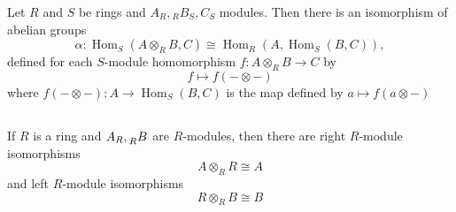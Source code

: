 \begin{theorem}
    Let $R$ and $S$ be rings and $A_{R},{ }_R B_{S}, C_{S}$ modules. Then there is an isomorphism of abelian groups
    \begin{equation*}
        \alpha: \operatorname{Hom}_{S}\left(A \otimes_R B, C\right)
        \cong
        \operatorname{Hom}_{R}\left(A, \operatorname{Hom}_{S}(B, C)\right),
    \end{equation*}
    defined for each $S$-module homomorphism $f: A \otimes_R B \rightarrow C$ by
    \begin{equation*}
        f\mapsto f(- \otimes -)
    \end{equation*}
    where $f(- \otimes -): A \rightarrow \operatorname{Hom}_S(B, C)$ is the map defined by $a\mapsto f(a\otimes -)$
\end{theorem}





\subsection{}


\begin{theorem}
    If $R$ is a ring and ${A}_{{R}}, \tensor[_R]{B}{}$ are $R$-modules, then there are right $R$-module isomorphisms
    \begin{equation*}
        A \otimes_R R \cong A
    \end{equation*}
    and left $R$-module isomorphisms
    \begin{equation*}
        R \otimes_R B \cong B
    \end{equation*}
\end{theorem}





